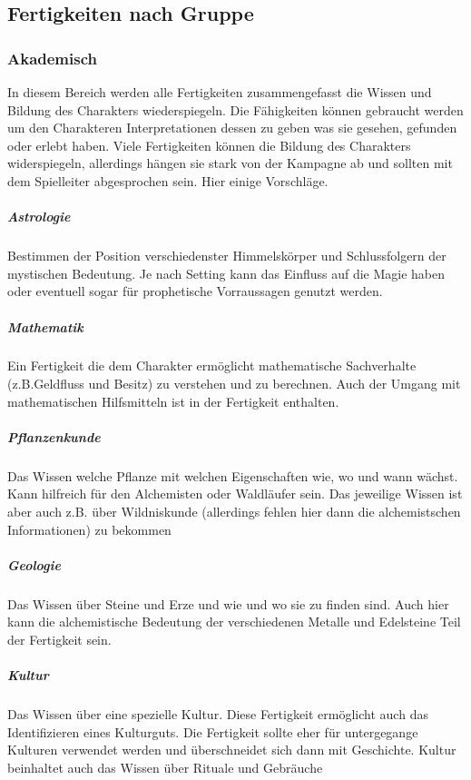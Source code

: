 \documentclass{article}
\begin{document}
\begin{center}
\subsection{Fertigkeiten nach Gruppe}
\end{center}

\subsubsection{Akademisch}

In diesem Bereich werden alle Fertigkeiten zusammengefasst die Wissen und Bildung des Charakters wiederspiegeln.
Die Fähigkeiten können gebraucht werden um den Charakteren Interpretationen dessen zu geben was sie gesehen, gefunden
oder erlebt haben. Viele Fertigkeiten können die Bildung des Charakters widerspiegeln, allerdings hängen sie stark
von der Kampagne ab und sollten mit dem Spielleiter abgesprochen sein. Hier einige Vorschläge.

\subparagraph{Astrologie}

Bestimmen der Position verschiedenster Himmelskörper und Schlussfolgern der mystischen Bedeutung. Je nach Setting
kann das Einfluss auf die Magie haben oder eventuell sogar für prophetische Vorraussagen genutzt werden.

\subparagraph{Mathematik}

Ein Fertigkeit die dem Charakter ermöglicht mathematische Sachverhalte (z.B.Geldfluss und Besitz) zu verstehen und
zu berechnen. Auch der Umgang mit mathematischen Hilfsmitteln ist in der Fertigkeit enthalten.

\subparagraph{Pflanzenkunde}

Das Wissen welche Pflanze mit welchen Eigenschaften wie, wo und wann wächst. Kann hilfreich für den Alchemisten oder
Waldläufer sein. Das jeweilige Wissen ist aber auch z.B. über Wildniskunde (allerdings fehlen hier dann die
alchemistschen Informationen) zu bekommen

\subparagraph{Geologie}

Das Wissen über Steine und Erze und wie und wo sie zu finden sind. Auch hier kann die alchemistische Bedeutung der
verschiedenen Metalle und Edelsteine Teil der Fertigkeit sein.

\subparagraph{Kultur}

Das Wissen über eine spezielle Kultur. Diese Fertigkeit ermöglicht auch das Identifizieren eines Kulturguts. Die
Fertigkeit sollte eher für untergegange Kulturen verwendet werden und überschneidet sich dann mit Geschichte. Kultur
beinhaltet auch das Wissen über Rituale und Gebräuche
\end{document}
